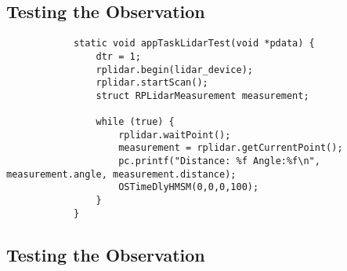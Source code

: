 			\subsection{Testing the Observation}
			\label{testcode:observation1}
			\begin{lstlisting}
			static void appTaskLidarTest(void *pdata) {
				dtr = 1;
				rplidar.begin(lidar_device);
				rplidar.startScan();
				struct RPLidarMeasurement measurement;
				
				while (true) {
					rplidar.waitPoint();
					measurement = rplidar.getCurrentPoint();
					pc.printf("Distance: %f Angle:%f\n", measurement.angle, measurement.distance);
					OSTimeDlyHMSM(0,0,0,100);
				}
			}
				\end{lstlisting}
			
		
		\subsection{Testing the Observation}
